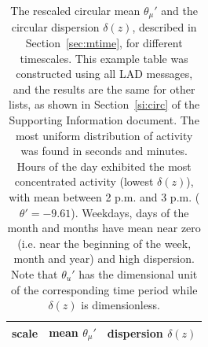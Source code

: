 \documentclass[%
	aip,
	jmp,%
	amsmath,amssymb,
	reprint,%
]{revtex4-1}
\begin{document}
																																																																																\begin{table}
																																																																																	\caption{The rescaled circular mean $\theta_\mu'$ and the circular dispersion $\delta(z)$, described in Section~\ref{sec:mtime}, for different timescales. This example table was constructed using all LAD messages, and the results are the same for other lists, as shown in Section~\ref{si:circ} of the Supporting Information document. The most uniform distribution of activity was found in seconds and minutes. 	Hours of the day exhibited the most concentrated activity (lowest $\delta(z)$), with mean between 2 p.m. and 3 p.m. ($\theta'=-9.61$). Weekdays, days of the month and months have mean near zero (i.e. near the beginning of the week, month and year) and high dispersion. Note that $\theta_u'$ has the dimensional unit of the corresponding time period while $\delta(z)$ is dimensionless.}
																																																																																	\begin{center}
																																																																																		\begin{tabular}{ |l|| c|c| }
																																																																																			\hline
																																																																																			scale & mean $\theta_\mu'$ & dispersion $\delta(z)$  \\ \hline
																																																																																			
																																																																																		\end{tabular}
																																																																																	\end{center}
																																																																																	\label{tab:circ}
																																																																																\end{table}
\end{document}
